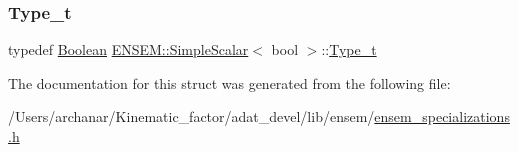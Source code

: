 \mbox{\label{structENSEM_1_1SimpleScalar_3_01bool_01_4_a1857cdcebad8e9a51ea6bf7234faf05d}} 
\subsubsection{\texorpdfstring{Type\_t}{Type\_t}\hspace{0.1cm}{\footnotesize\ttfamily [2/2]}}
{\footnotesize\ttfamily typedef \mbox{\hyperlink{group__defs_ga38f0cd64d26e121e75367986f2d7cd6c}{Boolean}} \mbox{\hyperlink{structENSEM_1_1SimpleScalar}{E\+N\+S\+E\+M\+::\+Simple\+Scalar}}$<$ bool $>$\+::\mbox{\hyperlink{structENSEM_1_1SimpleScalar_3_01bool_01_4_a1857cdcebad8e9a51ea6bf7234faf05d}{Type\+\_\+t}}}



The documentation for this struct was generated from the following file\+:\begin{DoxyCompactItemize}
\item 
/\+Users/archanar/\+Kinematic\+\_\+factor/adat\+\_\+devel/lib/ensem/\mbox{\hyperlink{lib_2ensem_2ensem__specializations_8h}{ensem\+\_\+specializations.\+h}}\end{DoxyCompactItemize}
